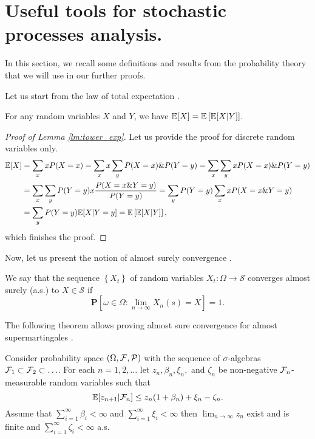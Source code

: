 \section{Useful tools for stochastic processes analysis.}\label{sec:basics-stoch-basics}
{\color{blue}
In this section, we recall some definitions and results from the probability theory that we will use in our further proofs.

Let us start from the law of total expectation \cite[Chapter V, Section $4$]{kolmogorov1933grundbegriffe}.

\begin{lemma}\label{lm:tower_exp}
For any random variables $X$ and $Y$, we have $\mathbb{E}[X] = \mathbb{E}\left[\mathbb{E}[X|Y]\right]$.
\end{lemma}
\begin{proof}[Proof of Lemma \ref{lm:tower_exp}]
    Let us provide the proof for discrete random variables only.
\begin{align}
\mathbb{E}[X] &= \sum_x x P(X=x) = \sum_x x\sum_yP(X=x)\&P(Y=y) = \sum_x\sum_y x P(X=x)\&P(Y=y)\nonumber\\
&= \sum_x\sum_y P(Y=y)x\frac{P(X=x\&Y=y)}{P(Y = y)}  = \sum_y P(Y=y) \sum_x xP(X=x\&Y=y)\nonumber\\
& = \sum_y P(Y=y) \mathbb{E}[X|Y=y] = \mathbb{E}\left[\mathbb{E}[X|Y]\right],
\end{align}
which finishes the proof.
\end{proof}

Now, let us present the notion of almost surely convergence \cite{stout1974almost}.
\begin{definition}
    We say that the sequence $\left\{X_t\right\}$ of random variables $X_t:\Omega\rightarrow \mathcal{S}$ converges almost surely (a.s.) to $X\in\mathcal{S}$ if 
    $$
    \mathbf{P}\left[\omega\in\Omega:\lim_{n\rightarrow\infty}X_n(s) = X\right] = 1.
    $$
\end{definition}

The following theorem allows proving almost sure convergence for almost supermartingales \cite[Theorem $1$]{robbins1971convergence}.
\begin{theorem}\label{th:r-s_theorem}
Consider probability space $(\Omega, \mathcal{F}, \mathcal{P})$ with the sequence of $\sigma$-algebras $\mathcal{F}_1\subset\mathcal{F}_2\subset\ldots$. For each $n = 1,2,\ldots$ let $z_n, \beta_n, \xi_n,$ and $\zeta_n$ be non-negative $\mathcal{F}_n$-measurable random variables such that
\begin{equation}\label{eq:a-super-martingale}
\mathbb{E}[z_{n+1}|\mathcal{F}_n]\leq z_n(1+\beta_n) + \xi_n - \zeta_n.
\end{equation}
Assume that $\sum_{i=1}^\infty \beta_i<\infty$ and $\sum_{i=1}^\infty \xi_i<\infty$ then $\lim_{n\rightarrow\infty}z_n$ exist and is finite and $\sum_{i=1}^\infty \zeta_i<\infty$ a.s.
\end{theorem}
}
